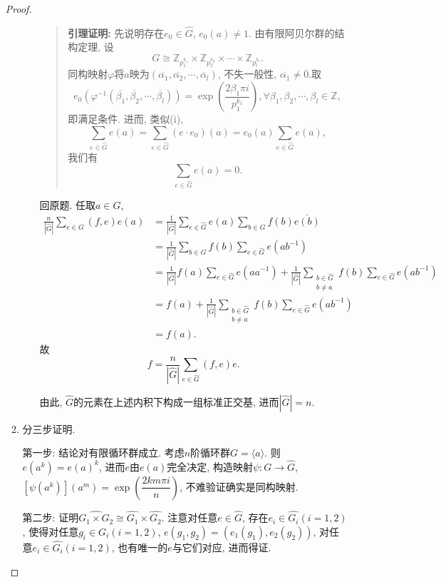 \documentclass[lang=cn,12pt,a4paper]{elegantpaper.cls}
\begin{document}
\begin{enumerate}
\begin{proof}
\begin{enumerate}
\begin{enumerate}[label=(\roman*)]
\begin{quote}
		\textbf{引理证明:} 先说明存在$e_0\in \hat{G}$, $e_0(a)\neq 1$. 由有限阿贝尔群的结构定理, 设\[G\cong \mathbb{Z}_{p_1^{k_1}}\times \mathbb{Z}_{p_2^{k_2}}\times \cdots\times \mathbb{Z}_{p_l^{k_l}}.\]同构映射$\varphi$将$a$映为$(\overline{\alpha_1},\overline{\alpha_2},\cdots,\overline{\alpha_l})$, 不失一般性, $\overline{\alpha_1}\neq \overline{0}$.取\[e_0(\varphi^{-1}(\overline{\beta_1},\overline{\beta_2},\cdots,\overline{\beta_l}))=\exp\left(\frac{2\beta_1 \pi i}{p_1^{k_1}}\right),\forall \beta_1,\beta_2,\cdots,\beta_l\in \mathbb Z,\]即满足条件. 进而, 类似(i), \[
		\sum_{e\in\hat{G}}e(a)=\sum_{e\in\hat{G}}(e\cdot e_0)(a)=e_0(a)\sum_{e\in\hat{G}}e(a),\]我们有\[\sum_{e\in\hat{G}}e(a)=0.\]
		
		\end{quote}
		
		回原题. 任取$a\in G$, \[\begin{aligned}
			\frac{n}{|\hat{G}|}\sum_{e\in G}(f,e)e(a)&=\frac{1}{|\hat{G}|}\sum_{e\in \hat{G}}e(a)\sum_{b\in G}f(b)\overline{e(b)}\\
			&=\frac{1}{|\hat{G}|}\sum_{b\in G}f(b)\sum_{e\in \hat{G}}e(ab^{-1})\\
			&=\frac{1}{|\hat{G}|}f(a)\sum_{e\in\hat{G}}e(aa^{-1})+\frac{1}{|\hat{G}|}\sum_{\substack{b\in\hat{G}\\b\neq a}}f(b)\sum_{e\in \hat{G}}e(ab^{-1})\\
			&=f(a)+\frac{1}{|\hat{G}|}\sum_{\substack{b\in\hat{G}\\b\neq a}}f(b)\sum_{e\in \hat{G}}e(ab^{-1})\\
			&=f(a).
		\end{aligned}\]故\[f=\frac{n}{|\hat{G}|}\sum_{e\in \hat{G}}(f,e)e.\]
		
		由此, $\hat{G}$的元素在上述内积下构成一组标准正交基, 进而$|\hat{G}|=n$.
	\end{enumerate}
		
		\item 分三步证明.
		
		第一步: 结论对有限循环群成立. 考虑$n$阶循环群$G=\langle a\rangle$. 则$e(a^k)=e(a)^k$, 进而$e$由$e(a)$完全决定, 构造映射$\psi:G\to \hat{G}$, $[\psi (a^k)](a^m)=\exp\left(\dfrac{2km\pi i}{n}\right)$, 不难验证确实是同构映射.
		
		第二步: 证明$\widehat{G_1\times G_2}\cong \hat{G_1}\times \hat{G_2}$. 注意对任意$e\in \hat{G}$, 存在$e_i\in \hat{G_i}(i=1,2)$, 使得对任意$g_i\in G_i(i=1,2)$, $e(g_1,g_2)=(e_1(g_1),e_2(g_2))$, 对任意$e_i\in \hat{G_i}(i=1,2)$, 也有唯一的$e$与它们对应, 进而得证.
		

\end{enumerate}
\end{proof}
\end{enumerate}
\end{document}
